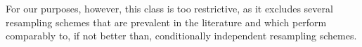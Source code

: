 For our purposes, however, this class is too restrictive, as it excludes several resampling schemes that are prevalent in the literature and which perform comparably to, if not better than, conditionally independent resampling schemes.






